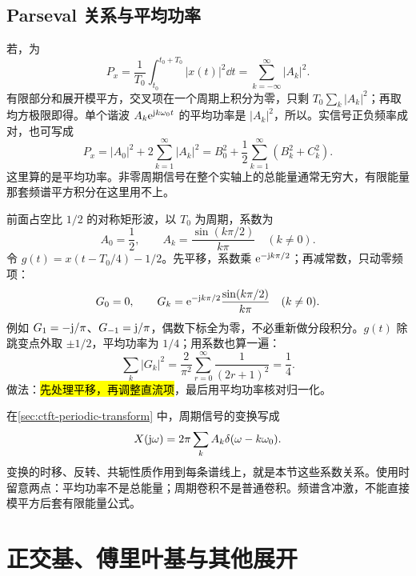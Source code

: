 \subsection{Parseval 关系与平均功率}
\label{subsec:ctfs-parseval}

若，为
\begin{equation}
  P_x=\frac1{T_0}\int_{t_0}^{t_0+T_0}|x(t)|^2\dd t
  =\sum_{k=-\infty}^{\infty}|A_k|^2.
  \label{eq:ctfs-parseval}
\end{equation}
有限部分和展开模平方，交叉项在一个周期上积分为零，只剩 $T_0\sum_k|A_k|^2$；再取均方极限即得。单个谐波 $A_k\mathrm{e}^{\mathrm{j} k\omega_0t}$ 的平均功率是 $|A_k|^2$，所以。实信号正负频率成对，也可写成
\[
  P_x=|A_0|^2+2\sum_{k=1}^{\infty}|A_k|^2
     =B_0^2+\frac12\sum_{k=1}^{\infty}(B_k^2+C_k^2).
\]
这里算的是平均功率。非零周期信号在整个实轴上的总能量通常无穷大，有限能量那套频谱平方积分在这里用不上。

\begin{example}[平移矩形波并去掉直流分量]
  前面占空比 $1/2$ 的对称矩形波，以 $T_0$ 为周期，系数为
  \[
    A_0=\frac12,\qquad A_k=\frac{\sin(k\pi/2)}{k\pi}\quad(k\ne0).
  \]
  令 $g(t)=x(t-T_0/4)-1/2$。先平移，系数乘 $\mathrm{e}^{-\mathrm{j} k\pi/2}$；再减常数，只动零频项：
  \[
    G_0=0,\qquad
    G_k=\mathrm{e}^{-\mathrm{j} k\pi/2}\frac{\sin(k\pi/2)}{k\pi}\quad(k\ne0).
  \]
  例如 $G_1=-\mathrm{j}/\pi$、$G_{-1}=\mathrm{j}/\pi$，偶数下标全为零，不必重新做分段积分。$g(t)$ 除跳变点外取 $\pm1/2$，平均功率为 $1/4$；用系数也算一遍：
  \[
    \sum_k|G_k|^2
    =\frac{2}{\pi^2}\sum_{r=0}^{\infty}\frac1{(2r+1)^2}
    =\frac14.
  \]
  做法：\hl{先处理平移，再调整直流项}，最后用平均功率核对归一化。
\end{example}

\begin{remark}[与傅里叶变换性质的对应]
  在\cref{sec:ctft-periodic-transform} 中，周期信号的变换写成
  \[
    X(\mathrm{j}\omega)=2\pi\sum_k A_k\delta(\omega-k\omega_0).
  \]
  变换的时移、反转、共轭性质作用到每条谱线上，就是本节这些系数关系。使用时留意两点：平均功率不是总能量；周期卷积不是普通卷积。频谱含冲激，不能直接模平方后套有限能量公式。
\end{remark}

\endgroup

\section{正交基、傅里叶基与其他展开}
\label{sec:fourier-orthogonal-bases}

